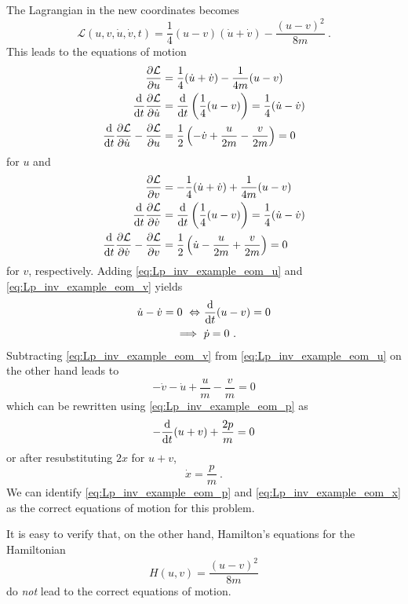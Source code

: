 \documentclass{scrartcl}
\newcommand{\ham}{H}
\newcommand{\PSL}{\mathcal{L}}
\begin{document}
The Lagrangian in the new coordinates becomes
\begin{equation}
\PSL(u,v,\dot{u},\dot{v},t) = \frac14(u-v)(\dot{u}+\dot{v}) - \frac{(u-v)^2}{8m} \ .
\end{equation}
This leads to the equations of motion
\begin{align}
\pdv{\PSL}{u} &= \frac14(\dot{u}+\dot{v}) - \frac{1}{4m}(u-v) \nonumber \\
\dv{t} \pdv{\PSL}{\dot{u}} &= \dv{t}\left(\frac14(u-v)\right) = \frac14(\dot{u}-\dot{v}) \nonumber \\
\dv{t} \pdv{\PSL}{\dot{u}}-\pdv{\PSL}{u} &= \frac12\left(-\dot{v}+\frac{u}{2m}-\frac{v}{2m}\right) = 0 \label{eq:Lp_inv_example_eom_u}
\end{align}
for $u$ and
\begin{align}
\pdv{\PSL}{v} &= -\frac14(\dot{u}+\dot{v}) + \frac{1}{4m}(u-v) \nonumber \\
\dv{t} \pdv{\PSL}{\dot{v}} &= \dv{t}\left(\frac14(u-v)\right) = \frac14(\dot{u}-\dot{v}) \nonumber \\
\dv{t} \pdv{\PSL}{\dot{v}}-\pdv{\PSL}{v} &= \frac12\left(\dot{u}-\frac{u}{2m}+\frac{v}{2m}\right) = 0 \label{eq:Lp_inv_example_eom_v}
\end{align}
for $v$, respectively. Adding \eqref{eq:Lp_inv_example_eom_u} and \eqref{eq:Lp_inv_example_eom_v} yields
\begin{align}
\dot{u}-\dot{v} = 0\ \Leftrightarrow &\ \dv{t}(u-v) = 0 \nonumber \\
\implies &\ \dot{p} = 0 \label{eq:Lp_inv_example_eom_p} \ .
\end{align}
Subtracting \eqref{eq:Lp_inv_example_eom_v} from \eqref{eq:Lp_inv_example_eom_u} on the other hand leads to
\begin{equation*}
-\dot{v}-\dot{u} + \frac{u}{m} - \frac{v}{m} = 0
\end{equation*}
which can be rewritten using \eqref{eq:Lp_inv_example_eom_p} as
\begin{equation*}
-\dv{t}(u+v) + \frac{2p}{m} = 0
\end{equation*}
or after resubstituting $2x$ for $u+v$,
\begin{equation}
\dot{x} = \frac{p}{m} \label{eq:Lp_inv_example_eom_x}\ .
\end{equation}
We can identify \eqref{eq:Lp_inv_example_eom_p} and \eqref{eq:Lp_inv_example_eom_x} as the correct equations of motion for this problem.

It is easy to verify that, on the other hand, Hamilton's equations for the Hamiltonian
\begin{equation*}
\ham(u,v) = \frac{(u-v)^2}{8m}
\end{equation*}
do \emph{not} lead to the correct equations of motion.
\end{document}
